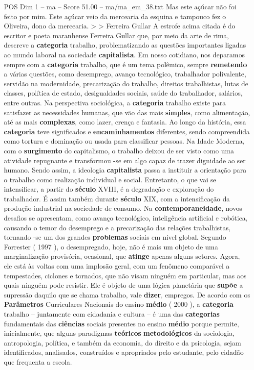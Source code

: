 \begin{textsample}{POS Dim 1 – ma – Score 51.00 – ma/ma\_em\_38.txt}
Mas este açúcar não foi feito por mim.
Este açúcar veio da mercearia da esquina e tampouco fez o Oliveira, dono da mercearia. > > Ferreira Gullar A estrofe acima citada é do escritor e poeta maranhense Ferreira Gullar que, por meio da arte de rima, descreve a \textbf{categoria} trabalho, problematizando as questões importantes ligadas ao mundo laboral na sociedade \textbf{capitalista}.
Em nosso cotidiano, nos deparamos sempre com a \textbf{categoria} trabalho, que é um tema polêmico, sempre \textbf{remetendo} a várias questões, como desemprego, avanço tecnológico, trabalhador polivalente, servidão na modernidade, precarização do trabalho, direitos trabalhistas, lutas de classes, política de estado, desigualdades sociais, saúde do trabalhador, salários, entre outras.
Na perspectiva sociológica, a \textbf{categoria} trabalho existe para satisfazer as necessidades humanas, que vão das mais \textbf{simples}, como alimentação, até as mais \textbf{complexas}, como lazer, crença e fantasia.
Ao longo da história, essa \textbf{categoria} teve significados e \textbf{encaminhamentos} diferentes, sendo compreendida como tortura e dominação ou usada para classificar pessoas.
Na Idade Moderna, com o \textbf{surgimento} do capitalismo, o trabalho deixou de ser visto como uma atividade repugnante e transformou -se em algo capaz de trazer dignidade ao ser humano.
Sendo assim, a ideologia \textbf{capitalista} passa a instituir a orientação para o trabalho como realização individual e social.
Entretanto, o que vai se intensificar, a partir do \textbf{século} XVIII, é a degradação e exploração do trabalhador.
É assim também durante \textbf{século} XIX, com a intensificação da produção industrial na sociedade de consumo.
Na \textbf{contemporaneidade}, novos desafios se apresentam, como avanço tecnológico, inteligência artificial e robótica, causando o temor do desemprego e a precarização das relações trabalhistas, tornando -se um dos grandes \textbf{problemas} sociais em nível global.
Segundo Forrester ( 1997 ), o desempregado, hoje, não é mais um objeto de uma marginalização provisória, ocasional, que \textbf{atinge} apenas alguns setores.
Agora, ele está às voltas com uma implosão geral, com um fenômeno comparável a tempestades, ciclones e tornados, que não visam ninguém em particular, mas aos quais ninguém pode resistir.
Ele é objeto de uma lógica planetária que \textbf{supõe} a supressão daquilo que se chama trabalho, vale \textbf{dizer}, empregos.
De acordo com os \textbf{Parâmetros} Curriculares Nacionais do ensino \textbf{médio} ( 2000 ), a \textbf{categoria} trabalho – juntamente com cidadania e cultura – é uma das \textbf{categorias} fundamentais das \textbf{ciências} sociais presentes no ensino \textbf{médio} porque permite, inicialmente, que alguns paradigmas \textbf{teóricos} \textbf{metodológicos} da sociologia, antropologia, política, e também da economia, do direito e da psicologia, sejam identificados, analisados, construídos e apropriados pelo estudante, pelo cidadão que frequenta a escola.

\end{textsample}
